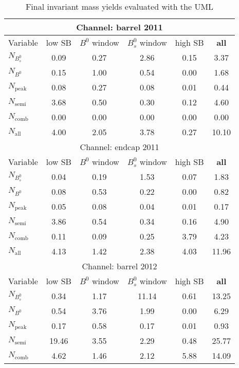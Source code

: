 \begin{table}
\centering
\caption{Final invariant mass yields evaluated with the UML}
\label{tab:UMLfinalyields}
\begin{tabular}{|l|c|c|c|c|c|}
\hline 
\hline 
 \multicolumn{6}{|c|}{Channel: barrel 2011} \\ 
\hline 
Variable  & low SB & $B^0$ window & $B_s^0$ window & high SB & \textbf{all} \\ 
\hline 
$N_{B_s^0}$ & 0.09 & 0.27 & 2.86 & 0.15 & 3.37  \\ 
$N_{B^0}$ & 0.15 & 1.00 & 0.54 & 0.00 & 1.68  \\ 
$N_{\mathrm{peak}}$ & 0.08 & 0.27 & 0.08 & 0.01 & 0.44  \\ 
$N_{\mathrm{semi}}$ & 3.68 & 0.50 & 0.30 & 0.12 & 4.60  \\ 
$N_{\mathrm{comb}}$ & 0.00 & 0.00 & 0.00 & 0.00 & 0.00  \\ 
\hline 
$N_{\mathrm{all}}$ & 4.00 & 2.05 & 3.78 & 0.27 & 10.10  \\ 
\hline 
\hline 
 \multicolumn{6}{|c|}{Channel: endcap 2011} \\ 
\hline 
Variable  & low SB & $B^0$ window & $B_s^0$ window & high SB & \textbf{all} \\ 
\hline 
$N_{B_s^0}$ & 0.04 & 0.19 & 1.53 & 0.07 & 1.83  \\ 
$N_{B^0}$ & 0.08 & 0.53 & 0.22 & 0.00 & 0.82  \\ 
$N_{\mathrm{peak}}$ & 0.05 & 0.08 & 0.04 & 0.01 & 0.17  \\ 
$N_{\mathrm{semi}}$ & 3.86 & 0.54 & 0.34 & 0.16 & 4.90  \\ 
$N_{\mathrm{comb}}$ & 0.11 & 0.09 & 0.25 & 3.79 & 4.23  \\ 
\hline 
$N_{\mathrm{all}}$ & 4.13 & 1.42 & 2.38 & 4.03 & 11.96  \\ 
\hline 
\hline 
 \multicolumn{6}{|c|}{Channel: barrel 2012} \\ 
\hline 
Variable  & low SB & $B^0$ window & $B_s^0$ window & high SB & \textbf{all} \\ 
\hline 
$N_{B_s^0}$ & 0.34 & 1.17 & 11.14 & 0.61 & 13.25  \\ 
$N_{B^0}$ & 0.54 & 3.76 & 1.99 & 0.00 & 6.29  \\ 
$N_{\mathrm{peak}}$ & 0.17 & 0.58 & 0.17 & 0.01 & 0.93  \\ 
$N_{\mathrm{semi}}$ & 19.46 & 3.55 & 2.29 & 0.48 & 25.77  \\ 
$N_{\mathrm{comb}}$ & 4.62 & 1.46 & 2.12 & 5.88 & 14.09  \\ 

\end{tabular}
\end{table}
